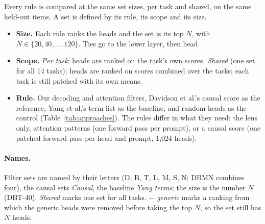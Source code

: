 \documentclass[10pt,a4paper]{article}
\begin{document}
Every rule is compared at the same set sizes, per task and shared, on the same held-out items. A set is defined by its rule, its scope and its size.
\begin{itemize}
\item \textbf{Size.} Each rule ranks the heads and the set is its top $N$, with $N\in\{20,40,\dots,120\}$. Ties go to the lower layer, then head.
\item \textbf{Scope.} \emph{Per task}: heads are ranked on the task's own scores. \emph{Shared} (one set for all 14 tasks): heads are ranked on scores combined over the tasks; each task is still patched with its own means.
\item \textbf{Rule.} Our decoding and attention filters, Davidson et al.'s causal score as the reference, Yang et al.'s term list as the baseline, and random heads as the control (Table~\ref{tab:approaches}). The rules differ in what they need: the lens only, attention patterns (one forward pass per prompt), or a causal score (one patched forward pass per head and prompt, 1{,}024 heads).
\end{itemize}

\paragraph{Names.} Filter sets are named by their letters (D, B, T, L, M, S, N; DBMN combines four), the causal sets \emph{Causal}, the baseline \emph{Yang terms}; the size is the number $N$ (DBT-40). \emph{Shared} marks one set for all tasks. \emph{$-$ generic} marks a ranking from which the generic heads were removed before taking the top $N$, so the set still has $N$ heads.
\end{document}
